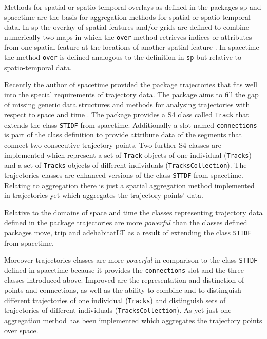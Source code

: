 \documentclass[12pt, oneside, a4paper]{scrbook}
\newcommand{\pkg}[1]{{\normalfont\fontseries{b}\selectfont #1}}
\let\code=\texttt
\begin{document}
Methods for spatial or spatio-temporal overlays as defined in the packages \pkg{sp} \citep{pebesma_sp:_2014} and \pkg{spacetime} \citep{pebesma_spacetime:_2012} are the basis for aggregation methods for spatial or spatio-temporal data. 
In \pkg{sp} the overlay of spatial features and/or grids are defined to combine numerically two maps in which the \code{over} method retrieves indices or attributes from one spatial feature at the locations of another spatial feature \citep{bivand_applied_2008}.
In \pkg{spacetime} the method \code{over} is defined analogous to the definition in \code{sp} but relative to spatio-temporal data.
\par\medskip

Recently the author of \pkg{spacetime} provided the package \pkg{trajectories} \citep{pebesma_trajectories:_2014} that fits well into the special requirements of trajectory data. The package aims to fill the gap of missing generic data structures and methods for analysing trajectories with respect to space and time \citep{klus_analysing_2014}. The package provides a S4 class called \code{Track} that extends the class \code{STIDF} from \pkg{spacetime}. Additionally a slot named \code{connections} is part of the class definition to provide attribute data of the segments that connect two consecutive trajectory points. Two further S4 classes are implemented which represent a set of \code{Track} objects of one individual (\code{Tracks}) and a set of \code{Tracks} objects of different individuals (\code{TracksCollection}). The \pkg{trajectories} classes are enhanced versions of the class \code{STTDF} from \pkg{spacetime}.
Relating to aggregation there is just a spatial aggregation method implemented in \pkg{trajectories} yet which aggregates the trajectory points' data.
\par\medskip

Relative to the domains of space and time the classes representing trajectory data defined in the package \pkg{trajectories} are more \textit{powerful} than the classes defined packages \pkg{move}, \pkg{trip} and \pkg{adehabitatLT} as a result of extending the class \code{STIDF} from \pkg{spacetime}.
\par\medskip

Moreover \pkg{trajectories} classes are more \textit{powerful} in comparison to the class \code{STTDF} defined in \pkg{spacetime} because it provides the \code{connections} slot and the three classes introduced above. Improved are the representation and distinction of points and connections, as well as the ability to combine and to distinguish different trajectories of one individual (\code{Tracks}) and distinguish sets of trajectories of different individuals (\code{TracksCollection}). As yet just one aggregation method has been implemented which aggregates the trajectory points over space. 
\par\medskip
\end{document}
